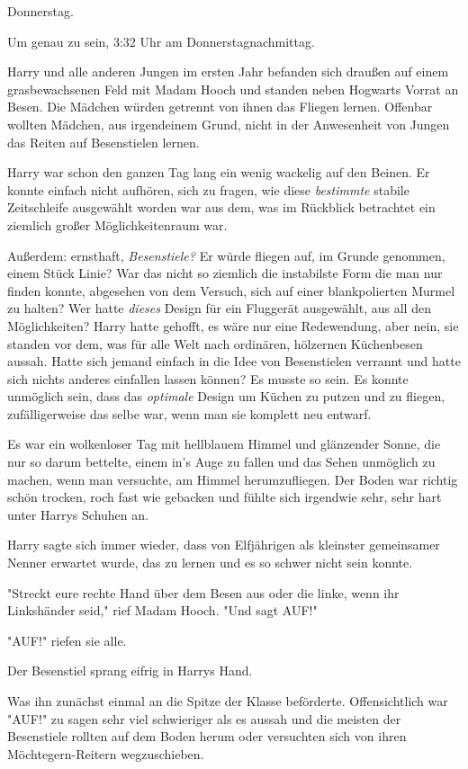 {Donnerstag.

Um genau zu sein, 3:32 Uhr am Donnerstagnachmittag.

Harry und alle anderen Jungen im ersten Jahr befanden sich draußen auf einem grasbewachsenen Feld mit Madam Hooch und standen neben Hogwarts Vorrat an Besen. Die Mädchen würden getrennt von ihnen das Fliegen lernen. Offenbar wollten Mädchen, aus irgendeinem Grund, nicht in der Anwesenheit von Jungen das Reiten auf Besenstielen lernen.

Harry war schon den ganzen Tag lang ein wenig wackelig auf den Beinen. Er konnte einfach nicht aufhören, sich zu fragen, wie diese \emph{bestimmte} stabile Zeitschleife ausgewählt worden war aus dem, was im Rückblick betrachtet ein ziemlich großer Möglichkeitenraum war.

Außerdem: ernsthaft, \emph{Besenstiele?} Er würde fliegen auf, im Grunde genommen, einem Stück Linie? War das nicht so ziemlich die instabilste Form die man nur finden konnte, abgesehen von dem Versuch, sich auf einer blankpolierten Murmel zu halten? Wer hatte \emph{dieses} Design für ein Fluggerät ausgewählt, aus all den Möglichkeiten? Harry hatte gehofft, es wäre nur eine Redewendung, aber nein, sie standen vor dem, was für alle Welt nach ordinären, hölzernen Küchenbesen aussah. Hatte sich jemand einfach in die Idee von Besenstielen verrannt und hatte sich nichts anderes einfallen lassen können? Es musste so sein. Es konnte unmöglich sein, dass das \emph{optimale} Design um Küchen zu putzen und zu fliegen, zufälligerweise das selbe war, wenn man sie komplett neu entwarf.

Es war ein wolkenloser Tag mit hellblauem Himmel und glänzender Sonne, die nur so darum bettelte, einem in's Auge zu fallen und das Sehen unmöglich zu machen, wenn man versuchte, am Himmel herumzufliegen. Der Boden war richtig schön trocken, roch fast wie gebacken und fühlte sich irgendwie sehr, sehr hart unter Harrys Schuhen an.

Harry sagte sich immer wieder, dass von Elfjährigen als kleinster gemeinsamer Nenner erwartet wurde, das zu lernen und es so schwer nicht sein konnte.

"Streckt eure rechte Hand über dem Besen aus oder die linke, wenn ihr Linkshänder seid," rief Madam Hooch. "Und sagt AUF!"

"AUF!" riefen sie alle.

Der Besenstiel sprang eifrig in Harrys Hand.

Was ihn zunächst einmal an die Spitze der Klasse beförderte. Offensichtlich war "AUF!" zu sagen sehr viel schwieriger als es aussah und die meisten der Besenstiele rollten auf dem Boden herum oder versuchten sich von ihren Möchtegern-Reitern wegzuschieben.

}
